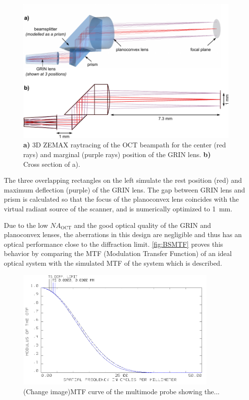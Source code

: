 \begin{figure}[h!]\centering
      \includegraphics{figures/30_DesignSimulation/Optical/beamsplitterAll.pdf}
      \caption{\textbf{a)} 3D ZEMAX raytracing of the OCT beampath for the center (red rays) and marginal (purple rays) position of the GRIN lens.
      \textbf{b)} Cross section of a).}
      \label{fig:BS}
\end{figure}

The three overlapping rectangles on the left simulate the rest position (red) and maximum deflection (purple) of the GRIN lens. The gap between GRIN lens and prism is calculated so that the focus of the planoconvex lens coincides with the virtual radiant source of the scanner, and is numerically optimized to \SI{1}{\milli\meter}.

	Due to the low $\mathit{NA_\mathrm{OCT}}$ and the good optical quality of the GRIN and planoconvex lenses, the aberrations in this design are negligible and thus has an optical performance close to the diffraction limit. \autoref{fig:BSMTF} proves this behavior by comparing the MTF (Modulation Transfer Function) of an ideal optical system with the simulated MTF of the system which is described.

\begin{figure}[h!]\centering
      \includegraphics[width=10cm]{figures/30_DesignSimulation/Optical/beamsplitterMTF.png}
      \caption{(Change image)MTF curve of the multimode probe showing the...}
      \label{fig:BSMTF}
\end{figure}

